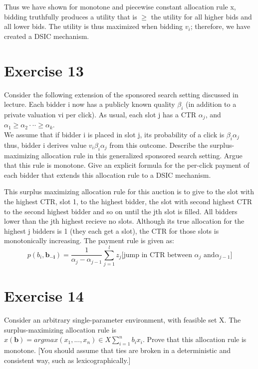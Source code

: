 \documentclass{article}
\begin{document}
Thus we have shown for monotone and piecewise constant allocation rule x,
bidding truthfully produces a utility that is $\geq$ the utility for all
higher bids and all lower bids. The utility is thus maximized when bidding
$v_i$; therefore, we have created a DSIC mechanism.

\section*{Exercise 13}
Consider the following extension of the sponsored search setting discussed in lecture. Each bidder i now has
a publicly known quality $\beta_i$ (in addition to a private valuation vi per click).
As usual, each slot j has a CTR $\alpha_j$, and $\alpha_1 \geq\alpha_2 · · ·
\geq\alpha_k$.\\

We assume that if bidder i is placed in slot j, its probability of a click is
$\beta_i \alpha_j$
thus, bidder i derives value $v_i\beta_i\alpha_j$ from this outcome.
Describe the surplus-maximizing allocation rule in this generalized sponsored search setting. Argue that
this rule is monotone. Give an explicit formula for the per-click payment of each bidder that extends this
allocation rule to a DSIC mechanism.

This surplus maximizing allocation rule for this auction is to give to the
slot with the highest CTR, slot 1, to the highest bidder, the slot with second
highest CTR to the second highest bidder and so on until the jth slot is
filled.  All bidders lower than the jth highest recieve no slots.  Although
its true allocation for the highest j bidders is 1 (they each get a slot), the
CTR for those slots is monotonically increasing. The payment rule is given as:
\begin{equation}
	p(b_i, \bm{b_{-i}}) = \dfrac{1}{\alpha_j - \alpha_{j-1}}\sum_{j=1}^{l}z_j[\text{jump in CTR between
	$\alpha_j$ and$\alpha_{j-1}$]}
\end{equation}

\section*{Exercise 14}
Consider an arbitrary single-parameter environment, with feasible set X. The
surplus-maximizing allocation rule is $x(\bm{b}) = arg max(x_1,...,x_n)\in X
\sum_{i=1}^{n}b_ix_i$. Prove that this allocation rule is monotone.
[You should assume that ties are broken in a deterministic and consistent way, such as lexicographically.]
\end{document}
